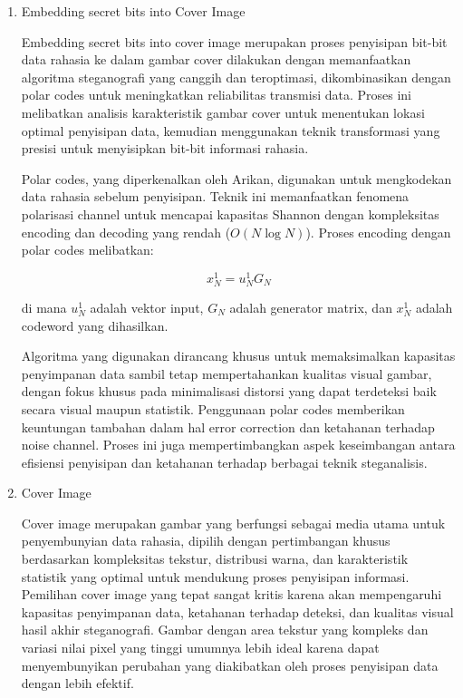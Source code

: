 \documentclass{ittelkom}
\begin{document}
\begin{enumerate}
    \item Embedding secret bits into Cover Image

          Embedding secret bits into cover image merupakan proses penyisipan bit-bit data
          rahasia ke dalam gambar cover dilakukan dengan memanfaatkan algoritma
          steganografi yang canggih dan teroptimasi, dikombinasikan dengan polar codes
          untuk meningkatkan reliabilitas transmisi data. Proses ini melibatkan analisis
          karakteristik gambar cover untuk menentukan lokasi optimal penyisipan data,
          kemudian menggunakan teknik transformasi yang presisi untuk menyisipkan bit-bit
          informasi rahasia.

          Polar codes, yang diperkenalkan oleh Arikan, digunakan untuk mengkodekan data
          rahasia sebelum penyisipan. Teknik ini memanfaatkan fenomena polarisasi
          channel untuk mencapai kapasitas Shannon dengan kompleksitas encoding dan
          decoding yang rendah ($O(N \log N)$). Proses encoding dengan polar codes
          melibatkan:

          \begin{equation}
              x_N^1 = u_N^1 G_N
          \end{equation}

          di mana $u_N^1$ adalah vektor input, $G_N$ adalah generator matrix, dan
          $x_N^1$ adalah codeword yang dihasilkan.

          Algoritma yang digunakan dirancang khusus untuk memaksimalkan kapasitas
          penyimpanan data sambil tetap mempertahankan kualitas visual gambar, dengan
          fokus khusus pada minimalisasi distorsi yang dapat terdeteksi baik secara
          visual maupun statistik. Penggunaan polar codes memberikan keuntungan tambahan
          dalam hal error correction dan ketahanan terhadap noise channel. Proses ini
          juga mempertimbangkan aspek keseimbangan antara efisiensi penyisipan dan
          ketahanan terhadap berbagai teknik steganalisis.

    \item Cover Image

          Cover image merupakan gambar yang berfungsi sebagai media utama untuk
          penyembunyian data rahasia, dipilih dengan pertimbangan khusus berdasarkan
          kompleksitas tekstur, distribusi warna, dan karakteristik statistik yang
          optimal untuk mendukung proses penyisipan informasi. Pemilihan cover image yang
          tepat sangat kritis karena akan mempengaruhi kapasitas penyimpanan data,
          ketahanan terhadap deteksi, dan kualitas visual hasil akhir steganografi.
          Gambar dengan area tekstur yang kompleks dan variasi nilai pixel yang tinggi
          umumnya lebih ideal karena dapat menyembunyikan perubahan yang diakibatkan oleh
          proses penyisipan data dengan lebih efektif.


\end{enumerate}
\end{document}
